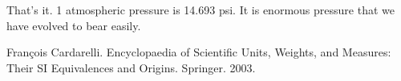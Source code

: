 \documentclass[a6paper]{article}
\begin{document}
That's it. 1 atmospheric pressure is 14.693 psi. It is enormous pressure that we have evolved to bear easily.
\addtocounter{footnote}{-1}

\begin{thebibliography}{00}
     Fran{\c c}ois Cardarelli. Encyclopaedia of Scientific Units, Weights, and Measures: Their SI Equivalences and Origins. Springer. 2003.
\end{thebibliography}
\end{document}
